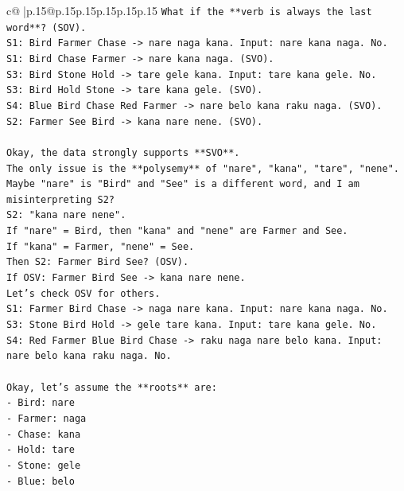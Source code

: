 \documentclass{article}
\begin{document}
{\begin{supertabular}{c@{$\;$}|p{.15\linewidth}@{}p{.15\linewidth}p{.15\linewidth}p{.15\linewidth}p{.15\linewidth}p{.15\linewidth}}
{{{\texttt{What if the **verb is always the last word**? (SOV).} \\
\texttt{S1: Bird Farmer Chase {-}> nare naga kana. Input: nare kana naga. No.} \\
\texttt{S1: Bird Chase Farmer {-}> nare kana naga. (SVO).} \\
\texttt{S3: Bird Stone Hold {-}> tare gele kana. Input: tare kana gele. No.} \\
\texttt{S3: Bird Hold Stone {-}> tare kana gele. (SVO).} \\
\texttt{S4: Blue Bird Chase Red Farmer {-}> nare belo kana raku naga. (SVO).} \\
\texttt{S2: Farmer See Bird {-}> kana nare nene. (SVO).} \\
\\ 
\texttt{Okay, the data strongly supports **SVO**.} \\
\texttt{The only issue is the **polysemy** of "nare", "kana", "tare", "nene".} \\
\texttt{Maybe "nare" is "Bird" and "See" is a different word, and I am misinterpreting S2?} \\
\texttt{S2: "kana nare nene".} \\
\texttt{If "nare" = Bird, then "kana" and "nene" are Farmer and See.} \\
\texttt{If "kana" = Farmer, "nene" = See.} \\
\texttt{Then S2: Farmer Bird See? (OSV).} \\
\texttt{If OSV: Farmer Bird See {-}> kana nare nene.} \\
\texttt{Let's check OSV for others.} \\
\texttt{S1: Farmer Bird Chase {-}> naga nare kana. Input: nare kana naga. No.} \\
\texttt{S3: Stone Bird Hold {-}> gele tare kana. Input: tare kana gele. No.} \\
\texttt{S4: Red Farmer Blue Bird Chase {-}> raku naga nare belo kana. Input: nare belo kana raku naga. No.} \\
\\ 
\texttt{Okay, let's assume the **roots** are:} \\
\texttt{{-} Bird: nare} \\
\texttt{{-} Farmer: naga} \\
\texttt{{-} Chase: kana} \\
\texttt{{-} Hold: tare} \\
\texttt{{-} Stone: gele} \\
\texttt{{-} Blue: belo} \\
}}}
\end{supertabular}}
\end{document}
